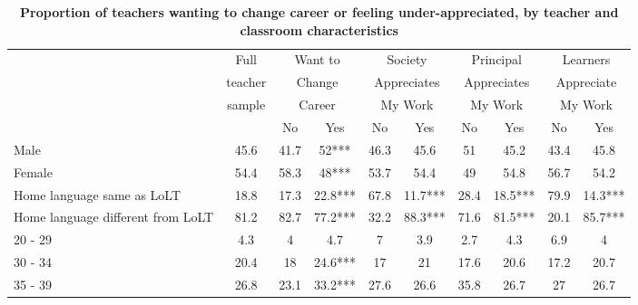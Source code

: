 \documentclass[12pt,preprint, authoryear]{article}
\numberwithin{equation}{section}
\numberwithin{figure}{section}
\numberwithin{table}{section}
\begin{document}
\begin{longtable}[htbp] {p{5cm}|c|*{2}{c}|*{2}{c}|*{2}{c}|*{2}{c}} \caption{\textbf{Proportion of teachers wanting to change career or feeling under-appreciated, by teacher and classroom characteristics}}
\label{tab:Teacher}\\ \hline \hline
&\multicolumn{1}{c|}{Full}&\multicolumn{2}{c|}{Want to}&\multicolumn{2}{c|}{Society }&\multicolumn{2}{c|}{Principal}&\multicolumn{2}{c}{Learners}\\
&\multicolumn{1}{c|}{teacher}&\multicolumn{2}{c|}{Change}&\multicolumn{2}{c|}{Appreciates}&\multicolumn{2}{c|}{ Appreciates}&\multicolumn{2}{c}{Appreciate}\\
&\multicolumn{1}{c|}{sample}&\multicolumn{2}{c|}{Career}&\multicolumn{2}{c|}{My Work}&\multicolumn{2}{c|}{My Work}&\multicolumn{2}{c}{My Work}\\ \hline
                                 &        & No                    & Yes                         & No                            & Yes                         & No   & Yes     & No   & Yes     \\ \hline
Male                             & 45.6         & 41.7                  & 52***                       & 46.3                          & 45.6                        & 51   & 45.2    & 43.4 & 45.8    \\
Female                           & 54.4         & 58.3                  & 48***                       & 53.7                          & 54.4                        & 49   & 54.8    & 56.7 & 54.2    \\
Home language same as LoLT        & 18.8         & 17.3                  & 22.8***                     & 67.8                          & 11.7***                     & 28.4 & 18.5*** & 79.9 & 14.3*** \\
Home language different from LoLT & 81.2         & 82.7                  & 77.2***                     & 32.2                          & 88.3***                     & 71.6 & 81.5*** & 20.1 & 85.7*** \\
20 - 29                          & 4.3          & 4                     & 4.7                         & 7                             & 3.9                         & 2.7  & 4.3     & 6.9  & 4       \\
30 - 34                          & 20.4         & 18                    & 24.6***                     & 17                            & 21                          & 17.6 & 20.6    & 17.2 & 20.7    \\
35 - 39                          & 26.8         & 23.1                  & 33.2***                     & 27.6                          & 26.6                        & 35.8 & 26.7    & 27   & 26.7    \\

\end{longtable}
\end{document}
